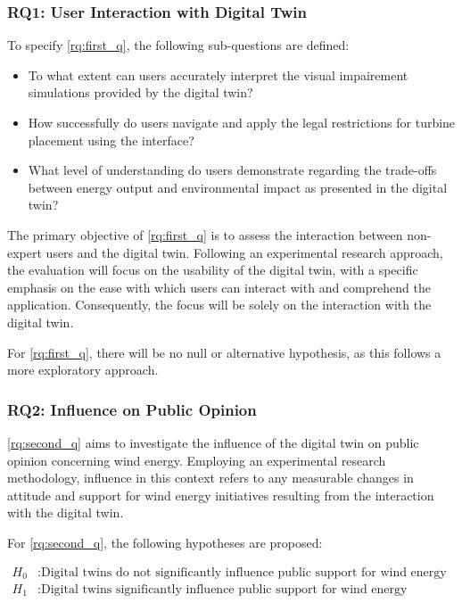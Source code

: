 \documentclass[11pt, titlepage, a4paper]{scrartcl}
\begin{document}
\begin{linenumbers}
\subsubsection{RQ1: User Interaction with Digital Twin}

To specify \ref{rq:first_q}, the following sub-questions are defined:

\begin{itemize}[label={--}]
    \item To what extent can users accurately interpret the visual impairement simulations provided by the digital twin?
    \item How successfully do users navigate and apply the legal restrictions for turbine placement using the interface?
    \item What level of understanding do users demonstrate regarding the trade-offs between energy output and environmental impact as presented in the digital twin?
\end{itemize}

The primary objective of \ref{rq:first_q} is to assess the interaction between non-expert users and the digital twin. Following an experimental research approach, the evaluation will focus on the usability of the digital twin, with a specific emphasis on the ease with which users can interact with and comprehend the application. Consequently, the focus will be solely on the interaction with the digital twin.

For \ref{rq:first_q}, there will be no null or alternative hypothesis, as this follows a more exploratory approach.

\subsubsection{RQ2: Influence on Public Opinion}

\ref{rq:second_q} aims to investigate the influence of the digital twin on public opinion concerning wind energy. Employing an experimental research methodology, influence in this context refers to any measurable changes in attitude and support for wind energy initiatives resulting from the interaction with the digital twin.

For \ref{rq:second_q}, the following hypotheses are proposed:

\begin{align}
    H_0 & : \text{Digital twins do not significantly influence public support for wind energy projects.} \\
    H_1 & : \text{Digital twins significantly influence public support for wind energy projects.}
\end{align}


\end{linenumbers}
\end{document}
